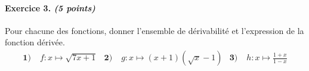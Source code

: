 \documentclass[11pt]{article}
\begin{document}
\paragraph{Exercice 3. \emph{(5 points)}} Pour chacune des fonctions, donner l'ensemble de
dérivabilité et l'expression de la fonction dérivée.
\begin{align*}
  \textbf{1)}\;& f:x\mapsto\sqrt{7x+1} &
  \textbf{2)}\;& g:x\mapsto (x+1)(\sqrt{x}-1)&
  \textbf{3)}\;& h:x\mapsto \frac{1+x}{1-x}
\end{align*}
\end{document}
